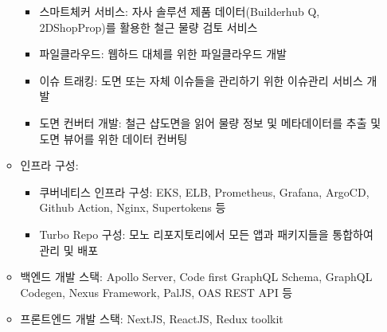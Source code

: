 \documentclass[10pt,a4paper,ragged2e]{altacv}
\begin{document}
\begin{fullwidth}
\begin{itemize}
\begin{itemize}[label=$\star$]
\begin{itemize}
          \item 스마트체커 서비스: 자사 솔루션 제품 데이터(Builderhub Q, 2DShopProp)를 활용한 철근 물량 검토 서비스
          \item 파일클라우드: 웹하드 대체를 위한 파일클라우드 개발
          \item 이슈 트래킹: 도면 또는 자체 이슈들을 관리하기 위한 이슈관리 서비스 개발
          \item 도면 컨버터 개발: 철근 샵도면을 읽어 물량 정보 및 메타데이터를 추출 및 도면 뷰어를 위한 데이터 컨버팅
        \end{itemize}
      \item 인프라 구성:
        \begin{itemize}
          \item 쿠버네티스 인프라 구성: EKS, ELB, Prometheus, Grafana, ArgoCD, Github Action, Nginx, Supertokens 등
          \item Turbo Repo 구성: 모노 리포지토리에서 모든 앱과 패키지들을 통합하여 관리 및 배포
        \end{itemize}
      \item 백엔드 개발 스택: Apollo Server, Code first GraphQL Schema, GraphQL Codegen, Nexus Framework, PalJS, OAS REST API 등
      \item 프론트엔드 개발 스택: NextJS, ReactJS, Redux toolkit
    \end{itemize}
	
\end{itemize}

	\divider


\end{fullwidth}
\end{document}
